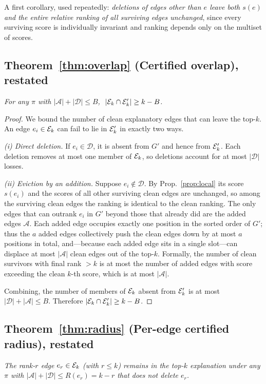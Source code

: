 A first corollary, used repeatedly: \emph{deletions of edges other than $e$
leave both $s(e)$ and the entire relative ranking of all surviving edges
unchanged}, since every surviving score is individually invariant and ranking
depends only on the multiset of scores.

\subsection*{Theorem~\ref{thm:overlap} (Certified overlap), restated}
\emph{For any $\pi$ with $|\mathcal{A}|+|\mathcal{D}|\le B$,
$\;|\mathcal{E}_k\cap\mathcal{E}_k'|\ge k-B$.}

\begin{proof}
We bound the number of clean explanatory edges that can leave the top-$k$. An
edge $e_i\in\mathcal{E}_k$ can fail to lie in $\mathcal{E}_k'$ in exactly two ways.

\emph{(i) Direct deletion.} If $e_i\in\mathcal{D}$, it is absent from $G'$ and
hence from $\mathcal{E}_k'$. Each deletion removes at most one member of $\mathcal{E}_k$, so
deletions account for at most $|\mathcal{D}|$ losses.

\emph{(ii) Eviction by an addition.} Suppose $e_i\notin\mathcal{D}$. By
Prop.~\ref{prop:local} its score $s(e_i)$ and the scores of all other surviving
clean edges are unchanged, so among the surviving clean edges the ranking is
identical to the clean ranking. The only edges that can outrank $e_i$ in $G'$
beyond those that already did are the added edges $\mathcal{A}$. Each added edge
occupies exactly one position in the sorted order of $G'$; thus the $a$ added
edges collectively push the clean edges down by at most $a$ positions in total,
and---because each added edge sits in a single slot---can displace at most
$|\mathcal{A}|$ clean edges out of the top-$k$. Formally, the number of clean
survivors with final rank $>k$ is at most the number of added edges with score
exceeding the clean $k$-th score, which is at most $|\mathcal{A}|$.

Combining, the number of members of $\mathcal{E}_k$ absent from $\mathcal{E}_k'$ is at most
$|\mathcal{D}|+|\mathcal{A}|\le B$. Therefore
$|\mathcal{E}_k\cap\mathcal{E}_k'|\ge k-B$.
\end{proof}

\subsection*{Theorem~\ref{thm:radius} (Per-edge certified radius), restated}
\emph{The rank-$r$ edge $e_r\in\mathcal{E}_k$ (with $r\le k$) remains in the top-$k$
explanation under any $\pi$ with $|\mathcal{A}|+|\mathcal{D}|\le R(e_r)=k-r$ that
does not delete $e_r$.}

